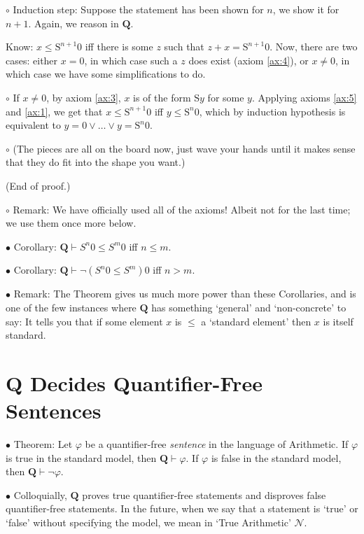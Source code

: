\documentclass{article}
\newcommand{\RQ}{\mathbf{Q}}
\newcommand{\TN}{\mathcal{N}}
\newcommand{\suc}{\mathrm{S}}
\newcommand\Point[1]{\noindent \hspace{\labelsep} {\large $\bullet$ #1} \smallskip}
\newcommand\point[1]{\noindent \hspace{\labelsep} {\small $\circ$ #1} \smallskip}
\newcommand\timestamp[1]{}
\newcommand\proofend{\hfill(End of proof.)}
\begin{document}
\point{Induction step: Suppose the statement has been shown for $n$, we show it for $n+1$. Again, we reason in $\RQ$.

Know: $x \leq \suc^{n+1}0$ iff there is some $z$ such that $z+x = \suc^{n+1}0$. Now, there are two cases: either $x = 0$, in which case such a $z$ does exist (axiom \ref{ax:4}), or $x \neq 0$, in which case we have some simplifications to do.}

\point{If $x \neq 0$, by axiom \ref{ax:3}, $x$ is of the form $\suc y$ for some $y$. Applying axioms \ref{ax:5} and \ref{ax:1}, we get that $x \leq \suc^{n+1}0$ iff $y \leq \suc^n 0$, which by induction hypothesis is equivalent to $y = 0 \lor \dots \lor y = \suc^n 0$.}

\point{(The pieces are all on the board now, just wave your hands until it makes sense that they do fit into the shape you want.)

\proofend}

\point{Remark: We have officially used all of the axioms! Albeit not for the last time; we use them once more below.}

\Point{Corollary: $\RQ \vdash S^n 0 \leq S^m 0$ iff $n \leq m$.}

\Point{Corollary: $\RQ \vdash \neg(S^n 0 \leq S^m) 0$ iff $n > m$.}

\Point{Remark: The Theorem gives us much more power than these Corollaries, and is one of the few instances where $\RQ$ has something `general' and `non-concrete' to say: It tells you that if some element $x$ is $\leq$ a `standard element' then $x$ is itself standard.}

\timestamp{35 min}

\section{$\RQ$ Decides Quantifier-Free Sentences}

\Point{Theorem: Let $\varphi$ be a quantifier-free \emph{sentence} in the language of Arithmetic. If $\varphi$ is true in the standard model, then $\RQ \vdash \varphi$. If $\varphi$ is false in the standard model, then $\RQ \vdash \neg\varphi$.}

\Point{Colloquially, $\RQ$ proves true quantifier-free statements and disproves false quantifier-free statements. In the future, when we say that a statement is `true' or `false' without specifying the model, we mean in `True Arithmetic' $\TN$.}
\end{document}

